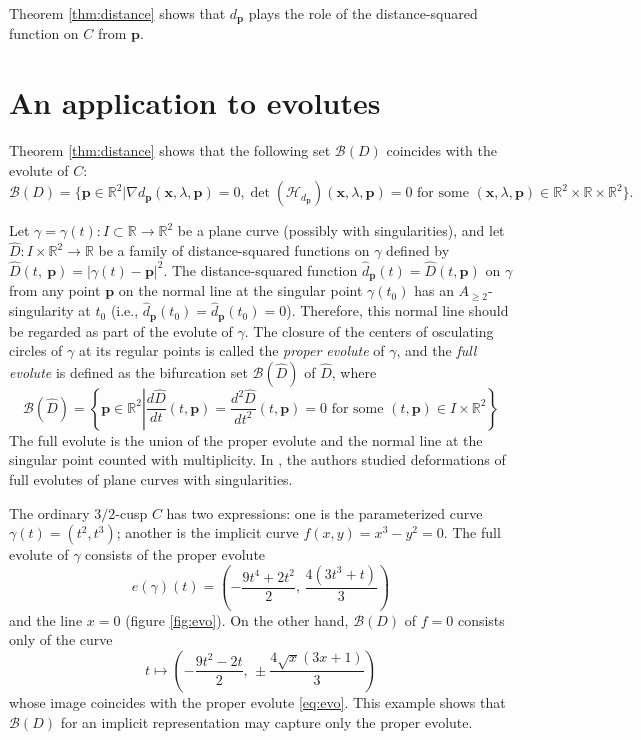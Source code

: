 \documentclass[12pt]{amsart}
\theoremstyle{plain}
\theoremstyle{definition}
\newcommand{\R}{\mathbb{R}}
\newcommand{\x}{\mathbf{x}}
\newcommand{\p}{\mathbf{p}}
\renewcommand{\geq}{\geqslant}
\begin{document}
Theorem \ref{thm:distance} shows that $d_\p$ plays the role of the distance-squared function on $C$ from $\p$. 

\section{An application to evolutes}

Theorem \ref{thm:distance} shows that the following set $\mathcal{B}(D)$ coincides with the evolute of $C$:
\[
 \mathcal{B}(D)=\{\p\in\R^2|\nabla d_{\p}(\x,\lambda,\p)=0, \det(\mathcal{H}_{d_{\p}})(\x, \lambda,\p)=0\text{ for some }(\x,\lambda,\p)\in\R^2\times \R\times \R^2\}.
\]

Let $\gamma=\gamma(t):I\subset \R \to \R^2$ be a plane curve (possibly with singularities), and let $\hat D:I\times \R^2 \to \R$ be a family of distance-squared functions on $\gamma$ defined by $\hat D(t,\ \p)=|\gamma(t)-\p|^2$. 
The distance-squared function $\hat d_\p(t) = \hat D(t,\p)$ on $\gamma$ from any point $\p$ on the normal line at the singular point $\gamma(t_0)$ has an $A_{\geq 2}$-singularity at $t_0$ (i.e., $\hat d_\p(t_0)=\hat d_\p(t_0)=0$). 
Therefore, this normal line should be regarded as part of the evolute of $\gamma$. 
The closure of the centers of osculating circles of $\gamma$ at its regular points is called the \textit{proper evolute} of $\gamma$, and the \textit{full evolute} is defined as the bifurcation set $\mathcal{B}(\hat D)$ of $\hat D$, where 
$$
\mathcal{B}(\hat D)=\left\{\p\in\R^2\left|\dfrac{d \hat D}{dt}(t,\p)=\dfrac{d^2 \hat D}{dt^2}(t,\p)=0\text{ for some }(t,\p)\in I \times \R^2\right.\right\}
$$ 
The full evolute is the union of the proper evolute and the normal line at the singular point counted with multiplicity. 
In \cite{ST2017}, the authors studied deformations of full evolutes of plane curves with singularities.   

The ordinary $3/2$-cusp $C$ has two expressions: 
one is the parameterized curve $\gamma(t)=(t^2,t^3)$; 
another is the implicit curve $f(x,y)=x^3-y^2=0$. 
The full evolute of $\gamma$ consists of the proper evolute
\begin{equation}
\label{eq:evo}
e(\gamma)(t) = \left(-\dfrac{9t^4+2t^2}2,\,\dfrac{4(3t^3+t)}3\right)
\end{equation}
and the line $x=0$ (figure \ref{fig:evo}). 
On the other hand, $\mathcal{B}(D)$ of $f=0$ consists only of the curve 
\begin{equation*}
t\mapsto \left(-\dfrac{9t^2-2t}2,\,\pm\dfrac{4\sqrt{x}(3x+1)}3\right)
\end{equation*}
whose image coincides with the proper evolute \eqref{eq:evo}. 
This example shows that $\mathcal{B}(D)$ for an implicit representation may capture only the proper evolute. 
\end{document}
